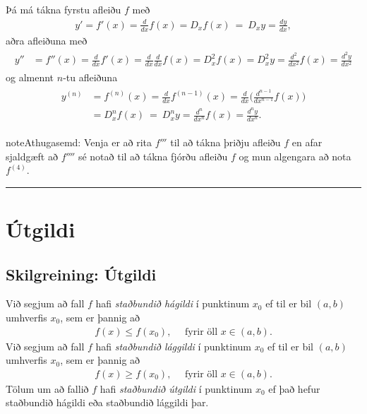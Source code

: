 \documentclass[b5paper,11pt,icelandic]{sphinxmanual}
\begin{document}
Þá má tákna fyrstu afleiðu \(f\) með
\begin{equation*}
\begin{split}y'= f'(x)=\frac{d}{dx}f(x)=D_xf(x)\ =\ D_x y= \frac{dy}{dx},\end{split}
\end{equation*}
aðra afleiðuna með
\begin{equation*}
\begin{split}\begin{aligned}
y'' &=
f''(x)=\frac{d}{dx}f'(x)=\frac{d}{dx}\frac{d}{dx}f(x)
= D^2_xf(x)= D^2_x y=\frac{d^2}{dx^2}f(x)=\frac{d^2 y}{dx^2}\end{aligned}\end{split}
\end{equation*}
og almennt \(n\)-tu afleiðuna
\begin{equation*}
\begin{split}\begin{aligned}
y^{(n)} &= f^{(n)}(x)=\frac{d}{dx}f^{(n-1)}(x)=
\frac{d}{dx}\Big(\frac{d^{n-1}}{dx^{n-1}}f(x)\Big) \\
&=D^n_xf(x)\ =\ D^n_x y
=\frac{d^n}{dx^n}f(x)
= \frac{d^n y}{dx^n}.\end{aligned}\end{split}
\end{equation*}
\begin{notice}{note}{Athugasemd:}
Venja er að rita \(f'''\) til að tákna þriðju afleiðu \(f\) en
afar sjaldgæft að \(f''''\) sé notað til að tákna fjórðu afleiðu
\(f\) og mun algengara að nota \(f^{(4)}\).
\end{notice}


\bigskip\hrule{}\bigskip



\section{Útgildi}
\label{kafli03:utgildi}\label{kafli03:id10}

\subsection{Skilgreining: Útgildi}
\label{kafli03:index-5}\label{kafli03:skilgreining-utgildi}
Við segjum að fall \(f\) hafi \textit{staðbundið hágildi} í punktinum
\(x_0\) ef til er bil \((a,b)\) umhverfis \(x_0\), sem er
þannig að
\begin{equation*}
\begin{split}f(x) \leq f(x_0), \quad \text{ fyrir öll } x \in (a,b).\end{split}
\end{equation*}
Við segjum að fall \(f\) hafi \textit{staðbundið lággildi} í punktinum
\(x_0\) ef til er bil \((a,b)\) umhverfis \(x_0\), sem er
þannig að
\begin{equation*}
\begin{split}f(x) \geq f(x_0), \quad \text{ fyrir öll } x \in (a,b).\end{split}
\end{equation*}
Tölum um að fallið \(f\) hafi \textit{staðbundið útgildi} í punktinum
\(x_0\) ef það hefur staðbundið hágildi eða staðbundið lággildi þar.
\end{document}
